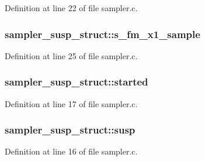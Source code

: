 Definition at line 22 of file sampler.\+c.

\subsubsection[{\texorpdfstring{s\+\_\+fm\+\_\+x1\+\_\+sample}{s_fm_x1_sample}}]{ sampler\+\_\+susp\+\_\+struct\+::s\+\_\+fm\+\_\+x1\+\_\+sample}\hypertarget{structsampler__susp__struct_a3a531092b561bfec3efe51a6139ff602}{}\label{structsampler__susp__struct_a3a531092b561bfec3efe51a6139ff602}


Definition at line 25 of file sampler.\+c.

\subsubsection[{\texorpdfstring{started}{started}}]{ sampler\+\_\+susp\+\_\+struct\+::started}\hypertarget{structsampler__susp__struct_a9e49593b1b9354e86921883a1e70de94}{}\label{structsampler__susp__struct_a9e49593b1b9354e86921883a1e70de94}


Definition at line 17 of file sampler.\+c.

\subsubsection[{\texorpdfstring{susp}{susp}}]{ sampler\+\_\+susp\+\_\+struct\+::susp}\hypertarget{structsampler__susp__struct_aca12395994eb3e4a8d3e45013c46b4d1}{}\label{structsampler__susp__struct_aca12395994eb3e4a8d3e45013c46b4d1}


Definition at line 16 of file sampler.\+c.

